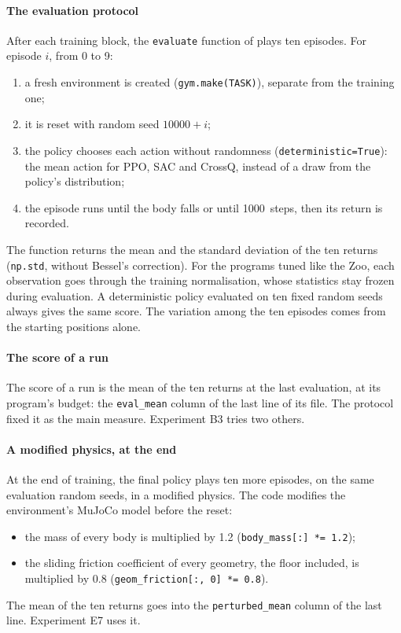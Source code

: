 \paragraph{The evaluation protocol}
After each training block, the \texttt{evaluate} function of  plays ten episodes. For episode
$i$, from 0 to 9:
\begin{enumerate}
  \item a fresh environment is created (\texttt{gym.make(TASK)}), separate from the training one;
  \item it is reset with random seed $\num{10000}+i$;
  \item the policy chooses each action without randomness (\texttt{deterministic=True}): the mean action for
    PPO, SAC and CrossQ, instead of a draw from the policy's distribution;
  \item the episode runs until the body falls or until \num{1000}~steps, then its return is recorded.
\end{enumerate}
The function returns the mean and the standard deviation of the ten returns (\texttt{np.std}, without Bessel's
correction). For the programs tuned like the Zoo, each observation goes through the training normalisation,
whose statistics stay frozen during evaluation. A deterministic policy evaluated on ten fixed random seeds
always gives the same score. The variation among the ten episodes comes from the starting positions alone.

\paragraph{The score of a run}
The score of a run is the mean of the ten returns at the last evaluation, at its program's budget: the
\texttt{eval\_mean} column of the last line of its file. The protocol fixed it as the main measure. Experiment
B3 tries two others.

\paragraph{A modified physics, at the end}
At the end of training, the final policy plays ten more episodes, on the same evaluation random seeds, in a
modified physics. The code modifies the environment's MuJoCo model before the reset:
\begin{itemize}
  \item the mass of every body is multiplied by 1.2 (\texttt{body\_mass[:] *= 1.2});
  \item the sliding friction coefficient of every geometry, the floor included, is multiplied by 0.8
    (\texttt{geom\_friction[:, 0] *= 0.8}).
\end{itemize}
The mean of the ten returns goes into the \texttt{perturbed\_mean} column of the last line. Experiment E7
uses it.

